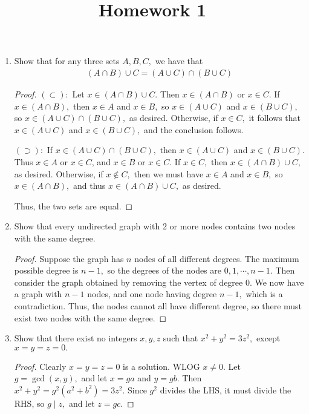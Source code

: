 \documentclass{article}
\begin{document}
\title{Homework 1}
\maketitle
\thispagestyle{fancy}

\begin{enumerate}
	\item Show that for any three sets $A, B, C,$ we have that
		\begin{align*}
			(A\cap B)\cup C = (A\cup C)\cap(B\cup C)
		\end{align*}
		\begin{proof}
			$(\subset):$ Let $x\in (A\cap B)\cup C.$ Then $x\in (A\cap B)$ or $x\in C.$ If $x\in (A\cap B),$ then $x\in A$ and $x\in B,$ so $x\in (A\cup C)$ and $x\in (B\cup C),$ so $x\in (A\cup C)\cap (B\cup C),$ as desired. Otherwise, if $x\in C,$ it follows that $x\in (A\cup C)$ and $x\in (B\cup C),$ and the conclusion follows.

			$(\supset):$ If $x\in (A\cup C)\cap(B\cup C),$ then $x\in (A\cup C)$ and $x\in (B\cup C).$ Thus $x\in A$ or $x\in C$, and $x\in B$ or $x\in C.$ If $x\in C,$ then $x\in (A\cap B)\cup C,$ as desired. Otherwise, if $x\not\in C,$ then we must have $x\in A$ and $x\in B,$ so $x\in (A\cap B),$ and thus $x\in (A\cap B)\cup C,$ as desired.

			Thus, the two sets are equal.
		\end{proof}

	\item Show that every undirected graph with 2 or more nodes contains two nodes with the same degree.
		\begin{proof}
			Suppose the graph has $n$ nodes of all different degrees. The maximum possible degree is $n-1,$ so the degrees of the nodes are $0, 1, \cdots, n-1.$ Then consider the graph obtained by removing the vertex of degree 0. We now have a graph with $n-1$ nodes, and one node having degree $n-1,$ which is a contradiction. Thus, the nodes cannot all have different degree, so there must exist two nodes with the same degree.
		\end{proof}

	\item Show that there exist no integers $x, y, z$ such that $x^2+y^2=3z^2,$ except $x=y=z=0.$
		\begin{proof}
			Clearly $x=y=z=0$ is a solution. WLOG $x\neq 0.$ Let $g=\gcd(x, y),$ and let $x=ga$ and $y=gb.$ Then $x^2+y^2=g^2(a^2+b^2)=3z^2.$ Since $g^2$ divides the LHS, it must divide the RHS, so $g\mid z,$ and let $z=gc.$


\end{proof}
\end{enumerate}
\end{document}
